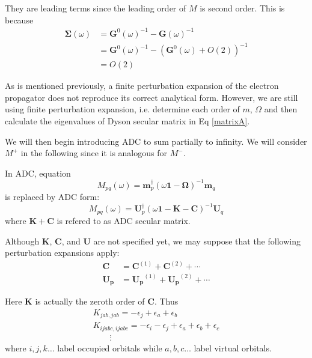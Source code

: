 They are leading terms since the leading order of $M$ is second order.
This is because
\begin{equation}
	\begin{aligned}
		\boldsymbol{\Sigma}(\omega)&=\boldsymbol{G}^{0}(\omega)^{-1}-\boldsymbol{G}(\omega)^{-1}
		\\
		&=\boldsymbol{G}^{0}(\omega)^{-1}-(\boldsymbol{G}^0(\omega)+O(2))^{-1}
		\\
		&=O(2)
	\end{aligned}
\end{equation}

As is mentioned previously, a finite perturbation expansion of the electron propagator does not reproduce its correct analytical form.
However, we are still using finite perturbation expansion, i.e. determine each order of $m$, $\Omega$ and then calculate the eigenvalues of Dyson secular matrix in Eq \ref{matrixA}.

We will then begin introducing ADC to sum partially to infinity.
We will consider $M^{+}$ in the following since it is analogous for $M^{-}$.

In ADC, equation 
\begin{equation}
	M_{p q}(\omega)=\boldsymbol{m}_{p}^{\dagger}(\omega \mathbf{1}-\boldsymbol{\Omega})^{-1} \boldsymbol{m}_{q}
\end{equation}
is replaced by ADC form:
\begin{equation}
	M_{p q}(\omega)=\boldsymbol{U}_{p}^{\dagger}(\omega \mathbf{1}-\boldsymbol{K}-\boldsymbol{C})^{-1} \boldsymbol{U}_{q}
\end{equation}
where
$\boldsymbol{K}+\boldsymbol{C}$ is refered to as ADC secular matrix.

Although $\boldsymbol{K}$, $\boldsymbol{C}$, and $\boldsymbol{U}$ are not specified yet,
we may suppose that the following perturbation expansions apply:
\begin{equation} \label{cuexpansion}
	\begin{aligned} 
		\boldsymbol{C} &=\boldsymbol{C}^{(1)}+\boldsymbol{C}^{(2)}+\cdots 
		\\ 
		\boldsymbol{U_{p}} &=\boldsymbol{U_{p}}^{(1)}+\boldsymbol{U_{p}}^{(2)}+\cdots
	\end{aligned}
\end{equation}

Here $\boldsymbol{K}$ is actually the zeroth order of $\boldsymbol{C}$.
Thus
\begin{equation}
	\begin{array}{l}{K_{j a b, j a b}=-\epsilon_{j}+\epsilon_{a}+\epsilon_{b}} \\ {K_{i j a b c, i j a b c}=-\epsilon_{i}-\epsilon_{j}+\epsilon_{a}+\epsilon_{b}+\epsilon_{c}} \\ {\qquad \vdots}\end{array}
\end{equation}
where $i, j, k \dots$ label occupied orbitals while $a, b, c \dots$ label virtual orbitals.

